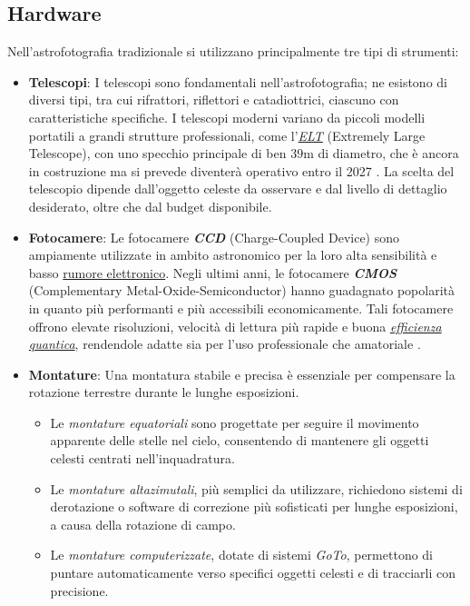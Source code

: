 \subsection{Hardware} \label{subsec:hardware}

Nell'astrofotografia tradizionale si utilizzano principalmente tre tipi di strumenti:

\begin{itemize}
    \item \textbf{Telescopi}: I telescopi sono fondamentali nell'astrofotografia; ne esistono di diversi tipi, tra cui rifrattori, riflettori e catadiottrici, ciascuno con caratteristiche specifiche. I telescopi moderni variano da piccoli modelli portatili a grandi strutture professionali, come l'\textit{\href{https://elt.eso.org/}{ELT}} (Extremely Large Telescope), con uno specchio principale di ben $ 39 \text{m} $ di diametro, che è ancora in costruzione ma si prevede diventerà operativo entro il 2027 \cite{elt}. La scelta del telescopio dipende dall'oggetto celeste da osservare e dal livello di dettaglio desiderato, oltre che dal budget disponibile.

    \item \textbf{Fotocamere}: Le fotocamere \textit{\textbf{CCD}} (Charge-Coupled Device) sono ampiamente utilizzate in ambito astronomico per la loro alta sensibilità e basso \hyperref[sec:noise]{rumore elettronico}. Negli ultimi anni, le fotocamere \textit{\textbf{CMOS}} (Complementary Metal-Oxide-Semiconductor) hanno guadagnato popolarità in quanto più performanti e più accessibili economicamente. Tali fotocamere offrono elevate risoluzioni, velocità di lettura più rapide e buona \href{https://it.wikipedia.org/wiki/Efficienza_quantica}{\textit{efficienza quantica}}, rendendole adatte sia per l'uso professionale che amatoriale \cite{image_processing}.
    
    \item \textbf{Montature}: Una montatura stabile e precisa è essenziale per compensare la rotazione terrestre durante le lunghe esposizioni.

    \begin{itemize}
        \item Le \textit{montature equatoriali} sono progettate per seguire il movimento apparente delle stelle nel cielo, consentendo di mantenere gli oggetti celesti centrati nell'inquadratura.
        \item Le \textit{montature altazimutali}, più semplici da utilizzare, richiedono sistemi di derotazione o software di correzione più sofisticati per lunghe esposizioni, a causa della rotazione di campo.
        \item Le \textit{montature computerizzate}, dotate di sistemi \textit{GoTo}, permettono di puntare automaticamente verso specifici oggetti celesti e di tracciarli con precisione.
    \end{itemize}

\end{itemize}

